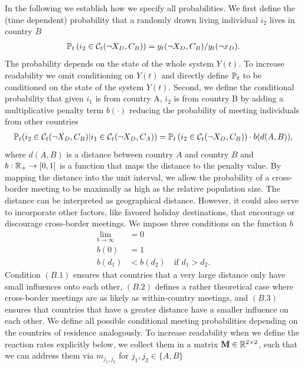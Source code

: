 In the following we establish how we specify all probabilities. We first define the (time dependent) probability that a randomly drawn living individual $i_2$ lives in country $B$ 
\begin{align}
\mathbb{P}_t\left(i_2 \in \mathcal{C}_t(\neg X_D, C_B)\right) =y_t(\neg X_D, C_B) / y_t(\neg x_D).
\end{align}
The probability depends on the state of the whole system $Y(t)$. To increase readability we omit conditioning on $Y(t)$ and directly define $\mathbb{P}_t$ to be conditioned on the state of the system $Y(t)$.  
Second, we define the conditional probability that given $i_1$ is from country A, $i_2$ is from country B by adding a multiplicative penalty term $b(\cdot)$ reducing the probability of meeting individuals from other countries 
\begin{align*}
\mathbb{P}_t(i_2 \in \mathcal{C}_t(\neg X_D, C_B) | i_1 \in \mathcal{C}_t(\neg X_D, C_A) ) = \mathbb{P}_t\left(i_2 \in \mathcal{C}_t(\neg X_D, C_B)\right) \cdot b(d(A, B)),
\end{align*}
where $d(A, B)$ is a distance between country $A$ and country $B$ and $b: \mathbb{R}_+ \to [0,1]$  is a function that maps the distance to the penalty value. By mapping the distance into the unit interval, we allow the probability of a cross-border meeting to be maximally as high as the relative population size. The distance can be interpreted as geographical distance. However, it could also serve to incorporate other factors, like favored holiday destinations, that encourage or discourage cross-border meetings. We impose three conditions on the function $b$
\begin{align}
\lim_{b \to \infty} &= 0 \tag{B.1}\\
b(0) &= 1 \tag{B.2}\\
b(d_1) &< b(d_2) \quad \textrm{if } d_1 > d_2. \tag{B.3}
\end{align}
Condition $(B.1)$ ensures that countries that a very large distance only have small influences onto each other, $(B.2)$ defines a rather theoretical case where cross-border meetings are as likely as within-country meetings, and $(B.3)$ ensures that countries that have a greater distance have a smaller influence on each other. We define all possible conditional meeting probabilities depending on the countries of residence analogously. To increase readability when we define the reaction rates explicitly below, we collect them in a matrix $\mathbf{M} \in \mathbb{R}^{2 \times 2}$, such that we can address them via $m_{j_1,j_2}$ for $j_1, j_2 \in \{A, B\}$
